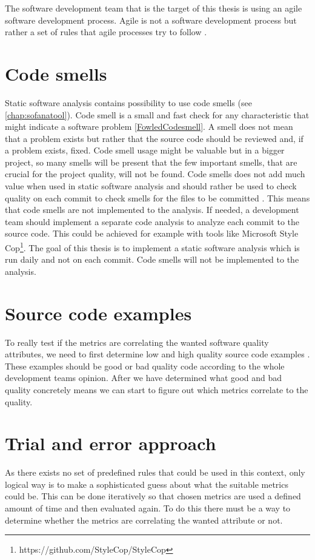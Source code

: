 The software development team that is the target of this thesis is using an agile software development process. Agile is not a software development process but rather a set of rules that agile processes try to follow \cite{agilemanifesto}.

\section{Code smells}

Static software analysis contains possibility to use code smells (see \autoref{chap:sofanatool}). Code smell is a small and fast check for any characteristic that might indicate a software problem \ref{FowledCodesmell}. A smell does not mean that a problem exists but rather that the source code should be reviewed and, if a problem exists, fixed. Code smell usage might be valuable but in a bigger project, so many smells will be present that the few important smells, that are crucial for the project quality, will not be found. Code smells does not add much value when used in static software analysis and should rather be used to check quality on each commit to check smells for the files to be committed \cite{tufano2015and}. This means that code smells are not implemented to the analysis. If needed, a development team should implement a separate code analysis to analyze each commit to the source code. This could be achieved for example with tools like Microsoft Style Cop\footnote{https://github.com/StyleCop/StyleCop}. The goal of this thesis is to implement a static software analysis which is run daily and not on each commit. Code smells will not be implemented to the analysis. 

\section{Source code examples}
To really test if the metrics are correlating the wanted software quality attributes, we need to first determine low and high quality source code examples \cite{coleman1994using}. These examples should be good or bad quality code according to the whole development teams opinion. After we have determined what good and bad quality concretely means we can start to figure out which metrics correlate to the quality. 

\section{Trial and error approach}
As there exists no set of predefined rules that could be used in this context, only logical way is to make a sophisticated guess about what the suitable metrics could be. This can be done iteratively so that chosen metrics are used a defined amount of time and then evaluated again. To do this there must be a way to determine whether the metrics are correlating the wanted attribute or not.





